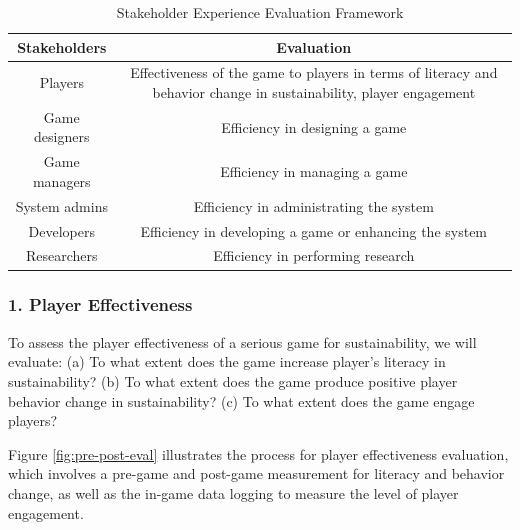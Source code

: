 \documentclass{sigchi}
\newcommand\tabhead[1]{\small\textbf{#1}}
\begin{document}
\begin{table}
  \centering
  \begin{tabular}{|c|c|}
    \hline
    \multicolumn{1}{|p{0.3\columnwidth}|}{\centering\tabhead{Stakeholders}} &
    \multicolumn{1}{|p{0.65\columnwidth}|}{\centering\tabhead{Evaluation}} \\
    \hline
    \multicolumn{1}{|p{0.3\columnwidth}|}{Players} &
    \multicolumn{1}{|p{0.65\columnwidth}|}{Effectiveness of the game
      to players in terms of literacy and behavior change in
      sustainability, player engagement} \\ 
    \hline
    \multicolumn{1}{|p{0.3\columnwidth}|}{Game designers} & \multicolumn{1}{|p{0.65\columnwidth}|}{Efficiency in designing a game} \\
    \hline
    \multicolumn{1}{|p{0.3\columnwidth}|}{Game managers} & \multicolumn{1}{|p{0.65\columnwidth}|}{Efficiency in managing a game} \\
    \hline
    \multicolumn{1}{|p{0.3\columnwidth}|}{System admins} & \multicolumn{1}{|p{0.65\columnwidth}|}{Efficiency in administrating the system} \\
    \hline
    \multicolumn{1}{|p{0.3\columnwidth}|}{Developers} & \multicolumn{1}{|p{0.65\columnwidth}|}{Efficiency in developing a game or enhancing the system} \\
    \hline
    \multicolumn{1}{|p{0.3\columnwidth}|}{Researchers} & \multicolumn{1}{|p{0.65\columnwidth}|}{Efficiency in performing research} \\
    \hline
  \end{tabular}
  \caption{Stakeholder Experience Evaluation Framework}
  \label{tab:evaluation-framework}
\end{table}

\subsubsection{1. Player Effectiveness}

To assess the player effectiveness of a serious game for
sustainability, we will evaluate: (a) To what extent does the game
increase player's literacy in sustainability? (b) To what extent does
the game produce positive player behavior change in sustainability?
(c) To what extent does the game engage players?

Figure \ref{fig:pre-post-eval} illustrates the process for player
effectiveness evaluation, which involves a pre-game and post-game
measurement for literacy and behavior change, as well as the in-game
data logging to measure the level of player engagement.
\end{document}

